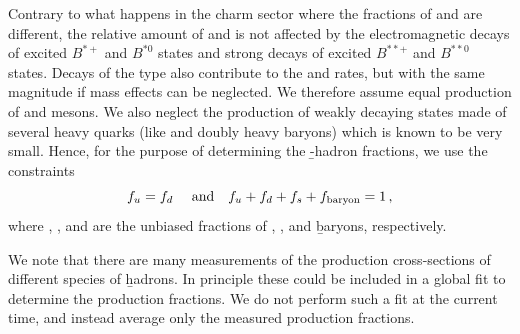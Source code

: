 Contrary to what happens in the charm sector where the fractions of 
 and  are different, the relative amount 
of \Bu and \Bd is not affected by the electromagnetic decays of 
excited $B^{*+}$ and $B^{*0}$ states and strong decays of excited 
$B^{**+}$ and $B^{**0}$ states. Decays of the type 
 also contribute to the \Bu and \Bd rates, 
but with the same magnitude if mass effects can be neglected.  
We therefore assume equal production of \Bu and \Bd mesons. We also  
neglect the production of weakly decaying states
made of several heavy quarks (like \Bc and doubly heavy baryons) 
which is known to be very small. Hence, for the purpose of determining 
the \b-hadron fractions, we use the constraints
\begin{equation}
\fBu = \fBd ~~~~\mbox{and}~~~ \fBu + \fBd + \fBs + \fbb = 1 \,,
\labe{constraints}
\end{equation}
where \fBu, \fBd, \fBs and \fbb
are the unbiased fractions of \Bu, \Bd, \Bs and \b baryons, respectively.

We note that there are many measurements of the production cross-sections of
different species of \b hadrons.
In principle these could be included in a global fit to determine the
production fractions.
We do not perform such a fit at the current time, and instead average only the
measured production fractions.

